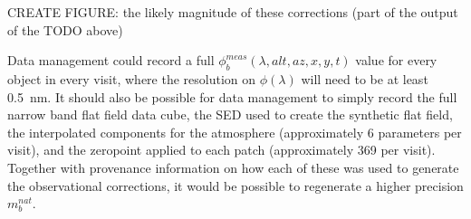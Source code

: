 \documentclass[12pt,preprint]{aastex}
\begin{document}
CREATE FIGURE: the likely magnitude of these corrections (part of the output
of the TODO above)

Data management could record a full $\phi_b^{meas}(\lambda,alt,az,x,y,t)$ value
for every object in every visit, where the resolution on
$\phi(\lambda)$ will need to be at least 0.5~nm.  It should also be possible
for data management to simply record the full narrow band flat field
data cube, the SED used to create the synthetic flat field, 
the interpolated components for the atmosphere (approximately 6
parameters per visit), and the zeropoint applied to each patch
(approximately 369 per visit). Together with provenance information on
how each of these was used to generate the observational corrections,
it would be possible to regenerate a higher precision $m_b^{nat}$. 






\end{document}
